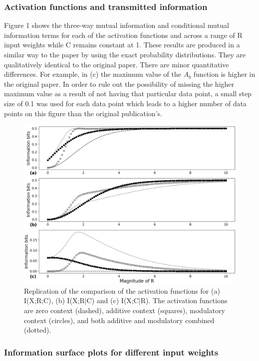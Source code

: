 \subsubsection{Activation functions and transmitted information}

Figure 1 shows the three-way mutual information and conditional mutual information terms for each of the activation functions and across a range of R input weights while C remains constant at 1. These results are produced in a similar way to the paper by using the exact probability distributions. They are qualitatively identical to the original paper. There are minor quantitative differences. For example, in (c) the maximum value of the $A_b$ function is higher in the original paper.  In order to rule out the possibility of missing the higher maximum value as a result of not having that particular data point, a small step size of 0.1 was used for each data point which leads to a higher number of data points on this figure than the original publication's. 

\begin{figure}[H]
    \includegraphics[width=\textwidth]{figure_1.png}
      \caption{Replication of the comparison of the activation functions for (a) I(X;R;C), (b) I(X;R|C) and (c) I(X;C|R). The activation functions are zero context (dashed), additive context (squares), modulatory context (circles), and both additive and modulatory combined (dotted).}
\end{figure}

\subsubsection{Information surface plots for different input weights}

